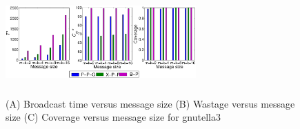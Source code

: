 % 
% 
%  

\begin{figure}[!ht]
  \centering	
 \includegraphics*[width=0.65\textwidth,height=40mm,angle=0]{./texfiles/Chapter_3/netsci/figs1/gnutella25_bt_wa_co.eps}
 
 \caption{\label{gnutellacomp} (A) Broadcast time versus message size (B) Wastage versus message size (C) Coverage versus message size for gnutella3}
\end{figure}


